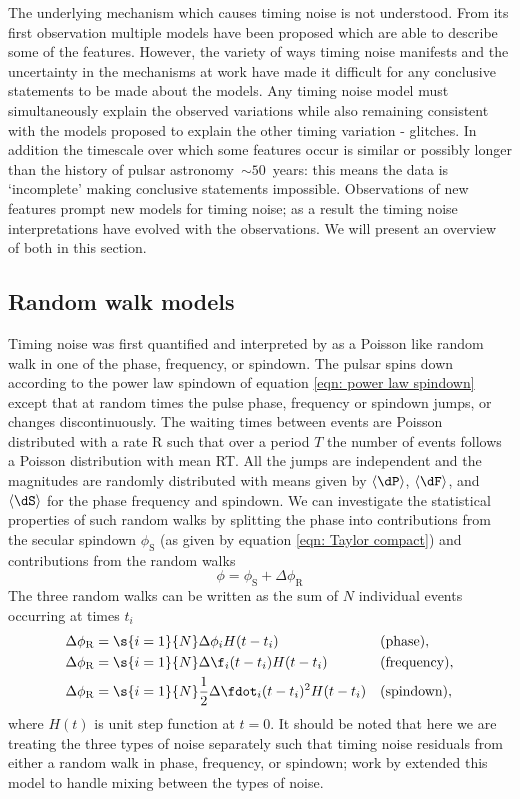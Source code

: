 The underlying mechanism which causes timing noise is not understood. From its
first observation multiple models have been proposed which are able to describe
some of the features. However, the variety of ways timing noise manifests and
the uncertainty in the mechanisms at work have made it difficult for any
conclusive statements to be made about the models. Any timing noise model must
simultaneously explain the observed variations while also remaining consistent
with the models proposed to explain the other timing variation - glitches.  In
addition the timescale over which some features occur is similar or possibly
longer than the history of pulsar astronomy~$\sim 50$~years: this means the
data is `incomplete' making conclusive statements impossible. Observations of
new features prompt new models for timing noise; as a result the timing noise
interpretations have evolved with the observations. We will present an overview
of both in this section.

\subsection{Random walk models}
\label{sec: TN interpretations random walk models}

Timing noise was first quantified and interpreted by \citet{Boynton1972} as a
Poisson like random walk in one of the phase, frequency, or spindown. The
pulsar spins down according to the power law spindown of equation \eqref{eqn:
power law spindown} except that at random times the pulse phase, frequency or
spindown jumps, or changes discontinuously. The waiting times between events
are Poisson distributed with a rate R such that over a period $T$ the number of
events follows a Poisson distribution with mean RT. All the jumps are
independent and the magnitudes are randomly distributed with means given by
$\langle\dP\rangle$, $\langle\dF\rangle$, and $\langle\dS\rangle$ for the phase
frequency and spindown. We can investigate the statistical properties of such
random walks by splitting the phase into contributions from the secular
spindown $\phi_{\mathrm{S}}$ (as given by equation \eqref{eqn: Taylor compact})
and contributions from the random walks
\begin{equation}
    \phi = \phi_{\mathrm{S}} + \Delta\phi_{\mathrm{R}}
\end{equation}
The three random walks can be written as the sum of $N$ individual events
occurring at times $t_{i}$
\begin{align}
    \Delta\phi_{\mathrm{R}} & = \s{i=1}{N}\Delta\phi_{i} H(t - t_{i}) 
     && \mathrm{(phase),} \\
    \Delta\phi_{\mathrm{R}} & = \s{i=1}{N}\Delta\f_{i} (t-t_{i})H(t - t_{i}) 
     && \mathrm{(frequency),} \\
    \Delta\phi_{\mathrm{R}} & = \s{i=1}{N}\frac{1}{2}\Delta\fdot_{i} (t-t_{i})^{2}H(t - t_{i}) 
     && \mathrm{(spindown),}
\end{align}
where $H(t)$ is unit step function at $t=0$. It should be noted that here we are
treating the three types of noise separately such that timing noise residuals 
from either a random walk in phase, frequency, or spindown; work by \citet{Cordes1980}
extended this model to handle mixing between the types of noise.

